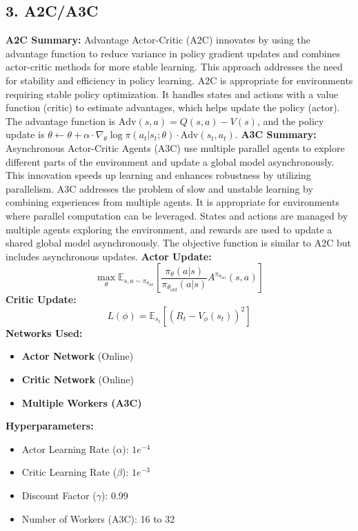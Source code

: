 \documentclass[a4paper,10pt]{article}
\begin{document}
\begin{multicols}{2}
\section*{3. A2C/A3C}
\textbf{A2C Summary:} Advantage Actor-Critic (A2C) innovates by using the advantage function to reduce variance in policy gradient updates and combines actor-critic methods for more stable learning. This approach addresses the need for stability and efficiency in policy learning. A2C is appropriate for environments requiring stable policy optimization. It handles states and actions with a value function (critic) to estimate advantages, which helps update the policy (actor). The advantage function is \( \text{Adv}(s, a) = Q(s, a) - V(s) \), and the policy update is \( \theta \leftarrow \theta + \alpha \cdot \nabla_\theta \log \pi(a_t | s_t; \theta) \cdot \text{Adv}(s_t, a_t) \).
\textbf{A3C Summary:} Asynchronous Actor-Critic Agents (A3C) use multiple parallel agents to explore different parts of the environment and update a global model asynchronously. This innovation speeds up learning and enhances robustness by utilizing parallelism. A3C addresses the problem of slow and unstable learning by combining experiences from multiple agents. It is appropriate for environments where parallel computation can be leveraged. States and actions are managed by multiple agents exploring the environment, and rewards are used to update a shared global model asynchronously. The objective function is similar to A2C but includes asynchronous updates.
\textbf{Actor Update:}
\[
\max_\theta \mathbb{E}_{s, a \sim \pi_{\theta_{\text{old}}}} \left[ \frac{\pi_\theta(a|s)}{\pi_{\theta_{\text{old}}}(a|s)} A^{\pi_{\theta_{\text{old}}}}(s, a) \right]
\]
\textbf{Critic Update:}
\[
L(\phi) = \mathbb{E}_{s_t} \left[ \left( R_t - V_\phi(s_t) \right)^2 \right]
\]
\textbf{Networks Used:}
\begin{itemize}
    \item \textbf{Actor Network} (Online)
    \item \textbf{Critic Network} (Online)
    \item \textbf{Multiple Workers (A3C)}
\end{itemize}
\textbf{Hyperparameters:}
\begin{itemize}
    \item Actor Learning Rate (\(\alpha\)): \(1e^{-4}\)
    \item Critic Learning Rate (\(\beta\)): \(1e^{-3}\)
    \item Discount Factor (\(\gamma\)): 0.99
    \item Number of Workers (A3C): 16 to 32
\end{itemize}


\end{multicols}
\end{document}
